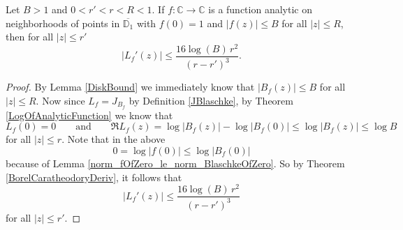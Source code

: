 \begin{theorem}[JBlaschkeDerivBound]
\label{JBlaschkeDerivBound}
\leanok
Let $B>1$ and $0 < r' < r < R<1$. If $f:\mathbb{C}\to\mathbb{C}$ is a function analytic
    on neighborhoods of points in $\overline{\mathbb{D}_1}$ with $f(0)=1$ and $|f(z)|\leq B$
    for all $|z|\leq R$, then for all $|z|\leq r'$
    $$|L_f'(z)|\leq\frac{16\log(B)\,r^2}{(r-r')^3}.$$
\end{theorem}
\begin{proof}
\leanok
By Lemma \ref{DiskBound} we immediately know that $|B_f(z)|\leq B$ for all $|z|\leq R$.
    Now since $L_f=J_{B_f}$ by Definition \ref{JBlaschke}, by Theorem
    \ref{LogOfAnalyticFunction} we know that
    $$L_f(0)=0\qquad\text{and}\qquad
      \Re L_f(z)=\log|B_f(z)|-\log|B_f(0)|\leq\log|B_f(z)|\leq\log B$$
    for all $|z|\leq r$. Note that in the above
    $$0=\log|f(0)|\leq\log|B_f(0)|$$
    because of Lemma \ref{norm_fOfZero_le_norm_BlaschkeOfZero}. So by
    Theorem \ref{BorelCaratheodoryDeriv}, it follows that
    $$|L_f'(z)|\leq\frac{16\log(B)\,r^2}{(r-r')^3}$$
    for all $|z|\leq r'$.
\end{proof}
